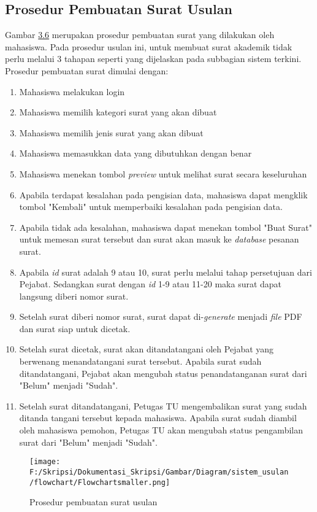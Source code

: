 \subsection{Prosedur Pembuatan Surat Usulan}
\label{sec:pembuatan_surat_usulan}
Gambar \hyperlink{pembuatan_usulan}{3.6} merupakan prosedur pembuatan surat yang dilakukan oleh mahasiswa. Pada prosedur usulan ini, untuk membuat surat akademik tidak perlu melalui 3 tahapan seperti yang dijelaskan pada subbagian sistem terkini. Prosedur pembuatan surat dimulai dengan:
\begin{enumerate}
	\item Mahasiswa melakukan login
	\item Mahasiswa memilih kategori surat yang akan dibuat
	\item Mahasiswa memilih jenis surat yang akan dibuat
	\item Mahasiswa memasukkan data yang dibutuhkan dengan benar
	\item Mahasiswa menekan tombol \textit{preview} untuk melihat surat secara keseluruhan
	\item Apabila terdapat kesalahan pada pengisian data, mahasiswa dapat mengklik tombol "Kembali" untuk memperbaiki kesalahan pada pengisian data.
	\item Apabila tidak ada kesalahan, mahasiswa dapat menekan tombol "Buat Surat" untuk memesan surat tersebut dan surat akan masuk ke \textit{database} pesanan surat.
	\item Apabila \textit{id} surat adalah 9 atau 10, surat perlu melalui tahap persetujuan dari Pejabat. Sedangkan surat dengan \textit{id} 1-9 atau 11-20 maka surat dapat langsung diberi nomor surat.
	\item Setelah surat diberi nomor surat, surat dapat di-\textit{generate} menjadi \textit{file} PDF dan surat siap untuk dicetak.	
	\item Setelah surat dicetak, surat akan ditandatangani oleh Pejabat yang berwenang menandatangani surat tersebut. Apabila surat sudah ditandatangani, Pejabat akan mengubah status penandatanganan surat dari "Belum" menjadi "Sudah".
	\item Setelah surat ditandatangani, Petugas TU mengembalikan surat yang sudah ditanda tangani tersebut kepada mahasiswa. Apabila surat sudah diambil oleh mahasiswa pemohon, Petugas TU akan mengubah status pengambilan surat dari "Belum" menjadi "Sudah".
	\
\end{enumerate}
\begin{figure}[H]
	\centering
		\texttt{[image: F:/Skripsi/Dokumentasi\_Skripsi/Gambar/Diagram/sistem\_usulan/flowchart/Flowchartsmaller.png]}
	{\caption{Prosedur pembuatan surat usulan}}
	\label{fig:pembuatan_usulan}
\end{figure}

